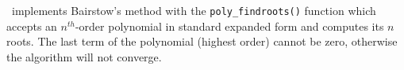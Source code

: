 \liquid\ implements Bairstow's method with the {\tt poly\_findroots()}
function which accepts an $n^{th}$-order polynomial in standard expanded form
and computes its $n$ roots.
The last term of the polynomial (highest order) cannot be zero, otherwise the
algorithm will not converge.


